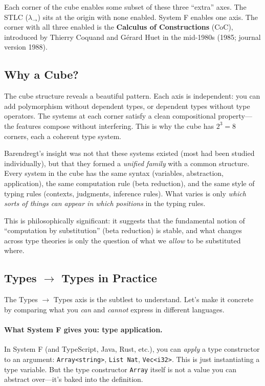 \documentclass[11pt,a4paper]{article}
\theoremstyle{definition}
\newcommand{\lam}{\lambda}
\begin{document}
Each corner of the cube enables some subset of these three ``extra'' axes.
The STLC ($\lam_\to$) sits at the origin with none enabled. System F enables
one axis. The corner with all three enabled is the \textbf{Calculus of
Constructions} (CoC), introduced by Thierry Coquand and G\'erard Huet in the
mid-1980s (1985; journal version 1988).

\subsection{Why a Cube?}

The cube structure reveals a beautiful pattern. Each axis is independent: you
can add polymorphism without dependent types, or dependent types without type
operators. The systems at each corner satisfy a clean compositional property---
the features compose without interfering. This is why the cube has $2^3 = 8$
corners, each a coherent type system.

Barendregt's insight was not that these systems existed (most had been
studied individually), but that they formed a \emph{unified family} with a
common structure. Every system in the cube has the same syntax (variables,
abstraction, application), the same computation rule (beta reduction), and
the same style of typing rules (contexts, judgments, inference rules). What
varies is only \emph{which sorts of things can appear in which positions} in
the typing rules.

This is philosophically significant: it suggests that the fundamental notion
of ``computation by substitution'' (beta reduction) is stable, and what changes
across type theories is only the question of what we \emph{allow} to be
substituted where.

\subsection{Types $\to$ Types in Practice}\label{sec:hkt}

The Types $\to$ Types axis is the subtlest to understand. Let's make it
concrete by comparing what you \emph{can} and \emph{cannot} express in
different languages.

\paragraph{What System F gives you: type application.}
In System F (and TypeScript, Java, Rust, etc.), you can \emph{apply} a type
constructor to an argument: \texttt{Array<string>}, \texttt{List Nat},
\texttt{Vec<i32>}. This is just instantiating a type variable. But the type
constructor \texttt{Array} itself is not a value you can abstract over---it's
baked into the definition.
\end{document}
